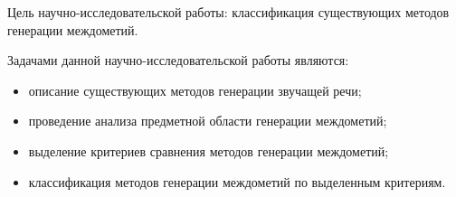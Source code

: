 Цель научно-исследовательской работы: классификация существующих методов генерации междометий.

Задачами данной научно-исследовательской работы являются:
\begin{itemize}[label=---]
	\item описание существующих методов генерации звучащей речи;
	\item проведение анализа предметной области генерации междометий;
	\item выделение критериев сравнения методов генерации междометий;
	\item классификация методов генерации междометий по выделенным критериям.
\end{itemize}
